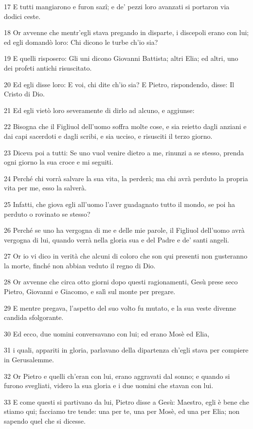 \par 17 E tutti mangiarono e furon sazî; e de' pezzi loro avanzati si portaron via dodici ceste.
\par 18 Or avvenne che mentr'egli stava pregando in disparte, i discepoli erano con lui; ed egli domandò loro: Chi dicono le turbe ch'io sia?
\par 19 E quelli risposero: Gli uni dicono Giovanni Battista; altri Elia; ed altri, uno dei profeti antichi risuscitato.
\par 20 Ed egli disse loro: E voi, chi dite ch'io sia? E Pietro, rispondendo, disse: Il Cristo di Dio.
\par 21 Ed egli vietò loro severamente di dirlo ad alcuno, e aggiunse:
\par 22 Bisogna che il Figliuol dell'uomo soffra molte cose, e sia reietto dagli anziani e dai capi sacerdoti e dagli scribi, e sia ucciso, e risusciti il terzo giorno.
\par 23 Diceva poi a tutti: Se uno vuol venire dietro a me, rinunzi a se stesso, prenda ogni giorno la sua croce e mi seguiti.
\par 24 Perché chi vorrà salvare la sua vita, la perderà; ma chi avrà perduto la propria vita per me, esso la salverà.
\par 25 Infatti, che giova egli all'uomo l'aver guadagnato tutto il mondo, se poi ha perduto o rovinato se stesso?
\par 26 Perché se uno ha vergogna di me e delle mie parole, il Figliuol dell'uomo avrà vergogna di lui, quando verrà nella gloria sua e del Padre e de' santi angeli.
\par 27 Or io vi dico in verità che alcuni di coloro che son qui presenti non gusteranno la morte, finché non abbian veduto il regno di Dio.
\par 28 Or avvenne che circa otto giorni dopo questi ragionamenti, Gesù prese seco Pietro, Giovanni e Giacomo, e salì sul monte per pregare.
\par 29 E mentre pregava, l'aspetto del suo volto fu mutato, e la sua veste divenne candida sfolgorante.
\par 30 Ed ecco, due uomini conversavano con lui; ed erano Mosè ed Elia,
\par 31 i quali, appariti in gloria, parlavano della dipartenza ch'egli stava per compiere in Gerusalemme.
\par 32 Or Pietro e quelli ch'eran con lui, erano aggravati dal sonno; e quando si furono svegliati, videro la sua gloria e i due uomini che stavan con lui.
\par 33 E come questi si partivano da lui, Pietro disse a Gesù: Maestro, egli è bene che stiamo qui; facciamo tre tende: una per te, una per Mosè, ed una per Elia; non sapendo quel che si dicesse.
